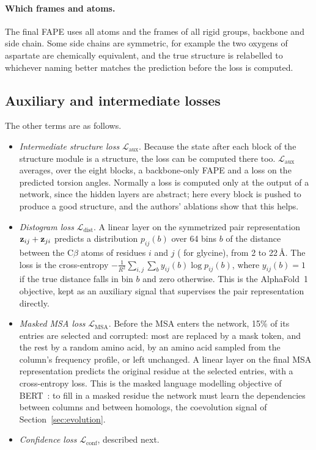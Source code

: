 \paragraph{Which frames and atoms.} The final FAPE uses all atoms and the frames of all rigid groups, backbone and side chain. Some side chains are symmetric, for example the two oxygens of aspartate are chemically equivalent, and the true structure is relabelled to whichever naming better matches the prediction before the loss is computed.

\subsection{Auxiliary and intermediate losses}

The other terms are as follows.

\begin{itemize}
  \item \emph{Intermediate structure loss} $\mathcal{L}_{\text{aux}}$. Because the state after each block of the structure module is a structure, the loss can be computed there too. $\mathcal{L}_{\text{aux}}$ averages, over the eight blocks, a backbone-only FAPE and a loss on the predicted torsion angles. Normally a loss is computed only at the output of a network, since the hidden layers are abstract; here every block is pushed to produce a good structure, and the authors' ablations show that this helps.
  \item \emph{Distogram loss} $\mathcal{L}_{\text{dist}}$. A linear layer on the symmetrized pair representation $\mathbf{z}_{ij}+\mathbf{z}_{ji}$ predicts a distribution $p_{ij}(b)$ over 64 bins $b$ of the distance between the C$\beta$ atoms of residues $i$ and $j$ (\Ca{} for glycine), from 2 to 22\,\AA. The loss is the cross-entropy $-\frac{1}{R^2}\sum_{i,j}\sum_b y_{ij}(b)\log p_{ij}(b)$, where $y_{ij}(b)=1$ if the true distance falls in bin $b$ and zero otherwise. This is the AlphaFold~1 objective, kept as an auxiliary signal that supervises the pair representation directly.
  \item \emph{Masked MSA loss} $\mathcal{L}_{\text{MSA}}$. Before the MSA enters the network, 15\% of its entries are selected and corrupted: most are replaced by a mask token, and the rest by a random amino acid, by an amino acid sampled from the column's frequency profile, or left unchanged. A linear layer on the final MSA representation predicts the original residue at the selected entries, with a cross-entropy loss. This is the masked language modelling objective of BERT~\citep{devlin2019}: to fill in a masked residue the network must learn the dependencies between columns and between homologs, the coevolution signal of Section~\ref{sec:evolution}.
  \item \emph{Confidence loss} $\mathcal{L}_{\text{conf}}$, described next.
\end{itemize}

